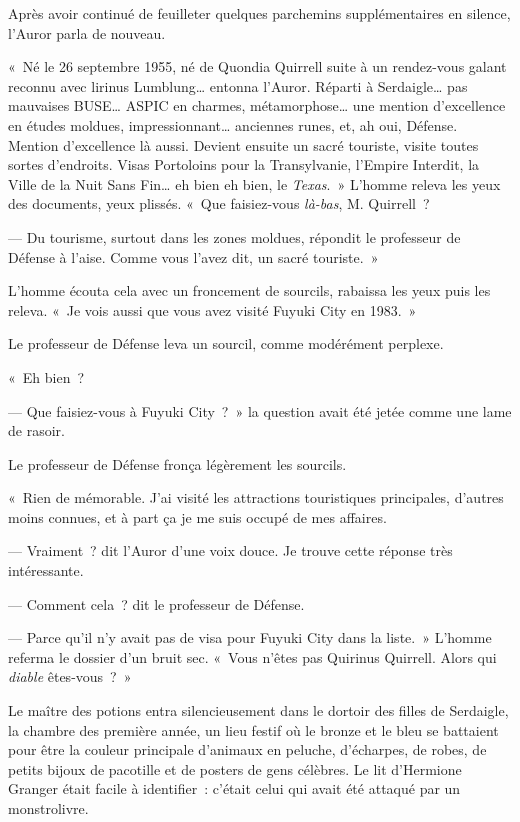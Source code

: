 Après avoir continué de feuilleter quelques parchemins supplémentaires en silence, l'Auror parla de nouveau.

«~Né le 26 septembre 1955, né de Quondia Quirrell suite à un rendez-vous galant reconnu avec lirinus Lumblung… entonna l'Auror. Réparti à Serdaigle… pas mauvaises BUSE… ASPIC en charmes, métamorphose… une mention d'excellence en études moldues, impressionnant… anciennes runes, et, ah oui, Défense. Mention d'excellence là aussi. Devient ensuite un sacré touriste, visite toutes sortes d'endroits. Visas Portoloins pour la Transylvanie, l'Empire Interdit, la Ville de la Nuit Sans Fin… eh bien eh bien, le \emph{Texas}.~» L'homme releva les yeux des documents, yeux plissés. «~Que faisiez-vous \emph{là-bas}, M. Quirrell~?

--- Du tourisme, surtout dans les zones moldues, répondit le professeur de Défense à l'aise. Comme vous l'avez dit, un sacré touriste.~»

L'homme écouta cela avec un froncement de sourcils, rabaissa les yeux puis les releva. «~Je vois aussi que vous avez visité Fuyuki City en 1983.~»

Le professeur de Défense leva un sourcil, comme modérément perplexe.

«~Eh bien~?

--- Que faisiez-vous à Fuyuki City~?~» la question avait été jetée comme une lame de rasoir.

Le professeur de Défense fronça légèrement les sourcils.

«~Rien de mémorable. J'ai visité les attractions touristiques principales, d'autres moins connues, et à part ça je me suis occupé de mes affaires.

--- Vraiment~? dit l'Auror d'une voix douce. Je trouve cette réponse très intéressante.

--- Comment cela~? dit le professeur de Défense.

--- Parce qu'il n'y avait pas de visa pour Fuyuki City dans la liste.~» L'homme referma le dossier d'un bruit sec. «~Vous n'êtes pas Quirinus Quirrell. Alors qui \emph{diable} êtes-vous~?~»

\later

Le maître des potions entra silencieusement dans le dortoir des filles de Serdaigle, la chambre des première année, un lieu festif où le bronze et le bleu se battaient pour être la couleur principale d'animaux en peluche, d'écharpes, de robes, de petits bijoux de pacotille et de posters de gens célèbres. Le lit d'Hermione Granger était facile à identifier~: c'était celui qui avait été attaqué par un monstrolivre.

